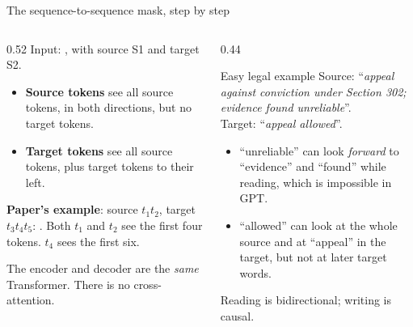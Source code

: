\documentclass[aspectratio=169,11pt]{beamer}
\begin{document}
\begin{frame}{The sequence-to-sequence mask, step by step}
  \begin{columns}[T]
    \begin{column}{0.52\textwidth}
      \small
      Input: , with source S1 and target S2.
      \begin{itemize}
        \item \textbf{Source tokens} see all source tokens, in both directions, but no target tokens.
        \item \textbf{Target tokens} see all source tokens, plus target tokens to their left.
      \end{itemize}
      \vspace{1mm}
      \textbf{Paper's example}: source $t_1t_2$, target $t_3t_4t_5$:
      .
      Both $t_1$ and $t_2$ see the first four tokens. $t_4$ sees the first six.
      \vspace{1mm}

      The encoder and decoder are the \emph{same} Transformer. There is no cross-attention.
    \end{column}
    \begin{column}{0.44\textwidth}
      \begin{exampleblock}{Easy legal example}
        \small
        Source: ``\emph{appeal against conviction under Section 302; evidence found unreliable}''.\\
        Target: ``\emph{appeal allowed}''.
        \vspace{1mm}

        \begin{itemize}
          \item ``unreliable'' can look \emph{forward} to ``evidence'' and ``found'' while reading, which is impossible in GPT.
          \item ``allowed'' can look at the whole source and at ``appeal'' in the target, but not at later target words.
        \end{itemize}
        Reading is bidirectional; writing is causal.
      \end{exampleblock}
    \end{column}
  \end{columns}
\end{frame}
\end{document}

